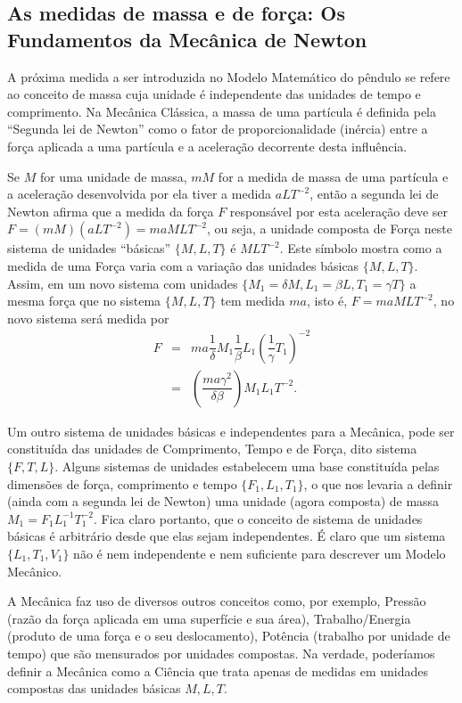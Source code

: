 \subsection{As medidas de massa e de força: Os Fundamentos da Mecânica de Newton}

    A próxima medida a ser introduzida no Modelo Matemático do pêndulo se refere ao conceito de massa cuja unidade é independente das unidades de tempo e comprimento. Na Mecânica Clássica, a massa de uma partícula é definida pela ``Segunda lei de Newton'' como o fator de proporcionalidade (inércia) entre a força aplicada a uma partícula e a aceleração decorrente desta influência.

    Se \(M\) for uma unidade de massa, \(mM\) for a medida de massa de uma partícula e a aceleração desenvolvida por ela tiver a medida \(aLT^{-2}\), então a segunda lei de Newton afirma que a medida da força \(F\) responsável por esta aceleração deve ser \(F = (mM)(aLT^{-2}) = ma MLT^{-2}\), ou seja, a unidade composta de Força neste sistema de unidades ``básicas'' \(\{M, L, T\}\) é \(MLT^{-2}\). Este símbolo mostra como a medida de uma Força varia com a variação das unidades básicas \(\{M, L, T\}\). Assim, em um novo sistema com unidades \(\{M_1 = \delta M, L_1 = \beta L, T_1 = \gamma T\}\) a mesma força que no sistema \(\{M, L, T\}\) tem medida \(ma\), isto é, \(F = maMLT^{-2}\), no novo sistema será medida por
    \[\begin{array}{rcl}
    F &=& ma \dfrac{1}{\delta} M_1 \dfrac{1}{\beta}L_1 \left(\dfrac{1}{\gamma}T_1\right)^{-2} \\[0.4cm]
    &=& \left(\dfrac{ma\gamma^2}{\delta\beta}\right) M_1L_1T^{-2}.
    \end{array}\]

    Um outro sistema de unidades básicas e independentes para a Mecânica, pode ser constituída das unidades de Comprimento, Tempo e de Força, dito sistema \(\{F, T, L\}\). Alguns sistemas de unidades estabelecem uma base constituída pelas dimensões de força, comprimento e tempo \(\{F_1, L_1, T_1\}\), o que nos levaria a definir (ainda com a segunda lei de Newton) uma unidade (agora composta) de massa \(M_1 = F_1L_1^{-1}T_1^{-2}\). Fica claro portanto, que o conceito de sistema de unidades básicas é arbitrário desde que elas sejam independentes. É claro que um sistema \(\{L_1, T_1, V_1\}\) não é nem independente e nem suficiente para descrever um Modelo Mecânico.

    A Mecânica faz uso de diversos outros conceitos como, por exemplo, Pressão (razão da força aplicada em uma superfície e sua área), Trabalho/Energia (produto de uma força e o seu deslocamento), Potência (trabalho por unidade de tempo) que são mensurados por unidades compostas. Na verdade, poderíamos definir a Mecânica como a Ciência que trata apenas de medidas em unidades compostas das unidades básicas \(M, L, T\).

